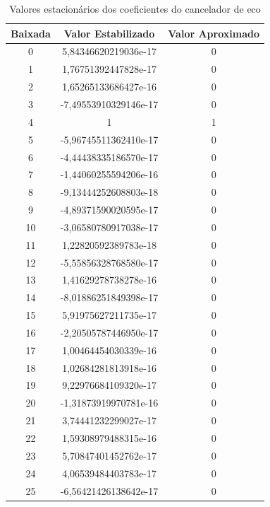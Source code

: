 \documentclass[a4paper,11pt]{report}
\begin{document}
\begin{table}[H]
  \centering
    \begin{tabular}{|ccc|}
    \hline
    \textbf{Baixada} & \textbf{Valor Estabilizado} & \textbf{Valor Aproximado} \\
    \hline
    0     & 5,84346620219036e-17 & 0 \\
    1     & 1,76751392447828e-17 & 0 \\
    2     & 1,65265133686427e-16 & 0 \\
    3     & -7,49553910329146e-17 & 0 \\
    4     & 1     & 1 \\
    5     & -5,96745511362410e-17 & 0 \\
    6     & -4,44438335186570e-17 & 0 \\
    7     & -1,44060255594206e-16 & 0 \\
    8     & -9,13444252608803e-18 & 0 \\
    9     & -4,89371590020595e-17 & 0 \\
    10    & -3,06580780917038e-17 & 0 \\
    11    & 1,22820592389783e-18 & 0 \\
    12    & -5,55856328768580e-17 & 0 \\
    13    & 1,41629278738278e-16 & 0 \\
    14    & -8,01886251849398e-17 & 0 \\
    15    & 5,91975627211735e-17 & 0 \\
    16    & -2,20505787446950e-17 & 0 \\
    17    & 1,00464454030339e-16 & 0 \\
    18    & 1,02684281813918e-16 & 0 \\
    19    & 9,22976684109320e-17 & 0 \\
    20    & -1,31873919970781e-16 & 0 \\
    21    & 3,74441232299027e-17 & 0 \\
    22    & 1,59308979488315e-16 & 0 \\
    23    & 5,70847401452762e-17 & 0 \\
    24    & 4,06539484403783e-17 & 0 \\
    25    & -6,56421426138642e-17 & 0 \\
    \hline
    \end{tabular}\caption{Valores estacionários dos coeficientes do cancelador de eco}
  \label{tab:addlabel}%
\end{table}%
\end{document}
